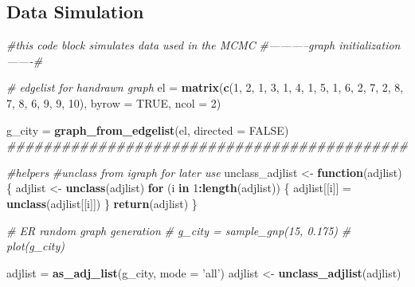 \documentclass[11pt,a4paper]{article}
\newenvironment{Shaded}{\begin{snugshade}}{\end{snugshade}}
\newcommand{\CommentTok}[1]{\textcolor[rgb]{0.56,0.35,0.01}{\textit{#1}}}
\newcommand{\ControlFlowTok}[1]{\textcolor[rgb]{0.13,0.29,0.53}{\textbf{#1}}}
\newcommand{\DataTypeTok}[1]{\textcolor[rgb]{0.13,0.29,0.53}{#1}}
\newcommand{\DecValTok}[1]{\textcolor[rgb]{0.00,0.00,0.81}{#1}}
\newcommand{\KeywordTok}[1]{\textcolor[rgb]{0.13,0.29,0.53}{\textbf{#1}}}
\newcommand{\NormalTok}[1]{#1}
\newcommand{\OperatorTok}[1]{\textcolor[rgb]{0.81,0.36,0.00}{\textbf{#1}}}
\newcommand{\OtherTok}[1]{\textcolor[rgb]{0.56,0.35,0.01}{#1}}
\newcommand{\StringTok}[1]{\textcolor[rgb]{0.31,0.60,0.02}{#1}}
\begin{document}
\hypertarget{data-simulation}{%
\subsection{Data Simulation}\label{data-simulation}}

\begin{Shaded}
\begin{Highlighting}[]
\CommentTok{#this code block simulates data used in the MCMC}
\CommentTok{#-----------graph initialization-------#}

\CommentTok{# edgelist for handrawn graph}
\NormalTok{el =}\StringTok{ }\KeywordTok{matrix}\NormalTok{(}\KeywordTok{c}\NormalTok{(}\DecValTok{1}\NormalTok{, }\DecValTok{2}\NormalTok{,}
              \DecValTok{1}\NormalTok{, }\DecValTok{3}\NormalTok{,}
              \DecValTok{1}\NormalTok{, }\DecValTok{4}\NormalTok{,}
              \DecValTok{1}\NormalTok{, }\DecValTok{5}\NormalTok{,}
              \DecValTok{1}\NormalTok{, }\DecValTok{6}\NormalTok{,}
              \DecValTok{2}\NormalTok{, }\DecValTok{7}\NormalTok{,}
              \DecValTok{2}\NormalTok{, }\DecValTok{8}\NormalTok{,}
              \DecValTok{7}\NormalTok{, }\DecValTok{8}\NormalTok{,}
              \DecValTok{6}\NormalTok{, }\DecValTok{9}\NormalTok{,}
              \DecValTok{9}\NormalTok{, }\DecValTok{10}\NormalTok{),}
            \DataTypeTok{byrow =} \OtherTok{TRUE}\NormalTok{,}
            \DataTypeTok{ncol =} \DecValTok{2}\NormalTok{)}

\NormalTok{g_city =}\StringTok{ }\KeywordTok{graph_from_edgelist}\NormalTok{(el, }\DataTypeTok{directed =} \OtherTok{FALSE}\NormalTok{)}
\CommentTok{############################################}

\CommentTok{#helpers}
\CommentTok{#unclass from igraph for later use}
\NormalTok{unclass_adjlist <-}\StringTok{ }\ControlFlowTok{function}\NormalTok{(adjlist) \{}
\NormalTok{  adjlist <-}\StringTok{ }\KeywordTok{unclass}\NormalTok{(adjlist)}
  \ControlFlowTok{for}\NormalTok{ (i }\ControlFlowTok{in} \DecValTok{1}\OperatorTok{:}\KeywordTok{length}\NormalTok{(adjlist)) \{}
\NormalTok{    adjlist[[i]] =}\StringTok{ }\KeywordTok{unclass}\NormalTok{(adjlist[[i]])}
\NormalTok{  \}}
  \KeywordTok{return}\NormalTok{(adjlist)}
\NormalTok{\}}

\CommentTok{# ER random graph generation}
\CommentTok{# g_city = sample_gnp(15, 0.175)}
\CommentTok{# plot(g_city)}

\NormalTok{adjlist =}\StringTok{ }\KeywordTok{as_adj_list}\NormalTok{(g_city, }\DataTypeTok{mode =} \StringTok{'all'}\NormalTok{)}
\NormalTok{adjlist <-}\StringTok{ }\KeywordTok{unclass_adjlist}\NormalTok{(adjlist)}


\end{Highlighting}
\end{Shaded}
\end{document}
